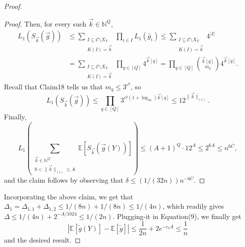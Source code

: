 \begin{proof}
\begin{proof}
Then, for every such $\vec k\in\mathbb N^Q$,
\begin{align*}
L_1(S_{\vec k}(\vec g))
&\le\sum_{\substack{I\subseteq\mathcal C\setminus X_T\\K(I)=\vec k}}\prod_{i\in I}L_1(\widehat g_i)
\le\sum_{\substack{I\subseteq\mathcal C\setminus X_T\\K(I)=\vec k}}4^{|I|}\\
&=\sum_{\substack{I\subseteq\mathcal C\setminus X_T\\K(I)=\vec k}}\prod_{q\in[Q]}4^{\vec k[q]}
=\prod_{q\in[Q]}\binom{\vec k[q]}{m_q}4^{\vec k[q]}.
\end{align*}
Recall that Claim18 tells us that $m_q\le3^{c^q}$, so
\begin{equation}
L_1(S_{\vec k}(\vec g))\le\prod_{q\in[Q]}3^{c^q(1+\log_34)\vec k[q]}\le12^{\|\vec k\|_{(c)}}.\tag{12}
\end{equation}
Finally,
\[
L_1\left(\sum_{\substack{\vec k\in\mathbb N^Q\\0<\|\vec k\|_{(c)}\le A}}\mathbb E[S_{\vec k}(\vec g(Y))]\right)
\le(A+1)^Q\cdot12^A\le2^{6A}\le n^{6\bar C},
\]
and the claim follows by observing that $\delta\le(1/(32n))n^{-6\bar C}$.
\end{proof}
Incorporating the above claim, we get that $\Delta_1=\Delta_{1,1}+\Delta_{1,2}\le1/(8n)+1/(8n)\le1/(4n)$, which readily gives $\Delta\le1/(4n)+2^{-A/1024}\le1/(2n)$. Plugging-it in Equation(9), we finally get
\[
|\mathbb E[\widetilde g(Y)]-\mathbb E[\widetilde g]|
\le\frac1{2n}+2e^{-c_IA}\le\frac1n
\]
and the desired result.
\end{proof}
